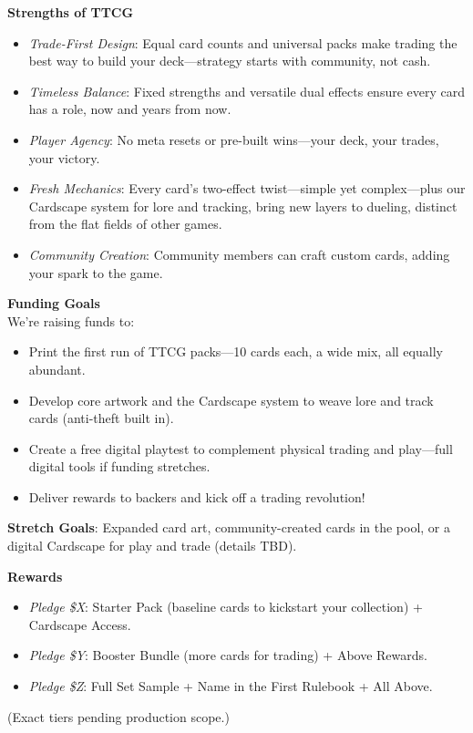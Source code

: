\textbf{Strengths of TTCG} \\
\begin{itemize}
    \item \textit{Trade-First Design}: Equal card counts and universal packs make trading the best way to build your deck—strategy starts with community, not cash.
    \item \textit{Timeless Balance}: Fixed strengths and versatile dual effects ensure every card has a role, now and years from now.
    \item \textit{Player Agency}: No meta resets or pre-built wins—your deck, your trades, your victory.
    \item \textit{Fresh Mechanics}: Every card’s two-effect twist—simple yet complex—plus our Cardscape system for lore and tracking, bring new layers to dueling, distinct from the flat fields of other games.
    \item \textit{Community Creation}: Community members can craft custom cards, adding your spark to the game.
\end{itemize}

\textbf{Funding Goals} \\
We’re raising funds to:
\begin{itemize}
    \item Print the first run of TTCG packs—10 cards each, a wide mix, all equally abundant.
    \item Develop core artwork and the Cardscape system to weave lore and track cards (anti-theft built in).
    \item Create a free digital playtest to complement physical trading and play—full digital tools if funding stretches.
    \item Deliver rewards to backers and kick off a trading revolution!
\end{itemize}
\textbf{Stretch Goals}: Expanded card art, community-created cards in the pool, or a digital Cardscape for play and trade (details TBD).

\textbf{Rewards} \\
\begin{itemize}
    \item \textit{Pledge \$X}: Starter Pack (baseline cards to kickstart your collection) + Cardscape Access.
    \item \textit{Pledge \$Y}: Booster Bundle (more cards for trading) + Above Rewards.
    \item \textit{Pledge \$Z}: Full Set Sample + Name in the First Rulebook + All Above.
\end{itemize}
(Exact tiers pending production scope.)

